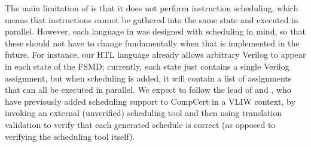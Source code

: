 The main limitation of \vericert{} is that it does not perform instruction scheduling, which means that instructions cannot be gathered into the same state and executed in parallel.
However, each language in \vericert{} was designed with scheduling in mind, so that these should not have to change fundamentally when that is implemented in the future.
For instance, our HTL language already allows arbitrary Verilog to appear in each state of the FSMD; currently, each state just contains a single Verilog assignment, but when scheduling is added, it will contain a list of assignments that can all be executed in parallel. We expect to follow the lead of \textcite{tristan08_formal_verif_trans_valid} and \textcite{six+20}, who have previously added scheduling support to CompCert in a VLIW context, by invoking an external (unverified) scheduling tool and then using translation validation to verify that each generated schedule is correct (as opposed to verifying the scheduling tool itself).


